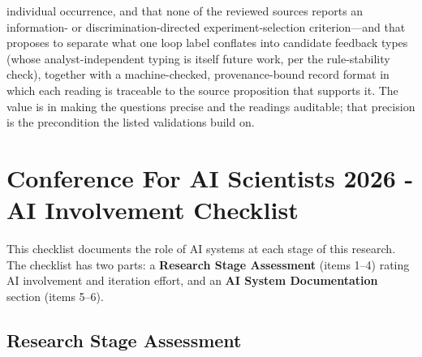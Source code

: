 \documentclass{article}
\begin{document}
individual occurrence, and that none of the reviewed sources reports an information- or discrimination-directed experiment-selection criterion---and that proposes to separate what one loop label conflates into candidate feedback types (whose analyst-independent typing is itself future work, per the rule-stability check), together with a machine-checked, provenance-bound record format in which each reading is traceable to the source proposition that supports it. The value is in making the questions precise and the readings auditable; that precision is the precondition the listed validations build on.




\newpage

\section*{Conference For AI Scientists 2026 - AI Involvement Checklist}
\label{checklist_ai_involvement}

This checklist documents the role of AI systems at each stage of this research.
The checklist has two parts: a \textbf{Research Stage Assessment} (items 1--4) rating AI involvement and iteration effort, and an \textbf{AI System Documentation} section (items 5--6).

\subsection*{Research Stage Assessment}
\end{document}
